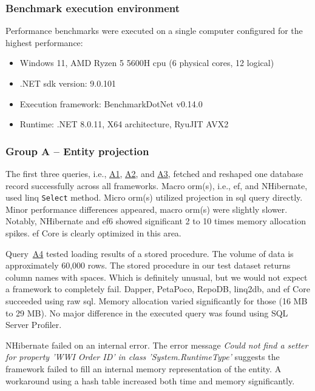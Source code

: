 \subsubsection{Benchmark execution environment}
Performance benchmarks were executed on a single computer configured for the highest performance:
\begin{itemize}
    \item Windows 11, AMD Ryzen 5 5600H \acrshort{cpu} (6 physical cores, 12 logical)
    \item .NET \acrshort{sdk} version: 9.0.101
    \item Execution framework: BenchmarkDotNet v0.14.0
    \item Runtime: .NET 8.0.11, X64 architecture, RyuJIT AVX2
\end{itemize}

\subsubsection{Group A -- Entity projection}
The first three queries, i.e., \hyperref[query:a1]{A1}, \hyperref[query:a2]{A2}, and \hyperref[query:a3]{A3}, fetched and reshaped one database record successfully across all frameworks. Macro \acrshort{orm}(s), i.e., \acrshort{ef}, and NHibernate, used \acrshort{linq} \texttt{Select} method. Micro \acrshort{orm}(s) utilized projection in \acrshort{sql} query directly.
Minor performance differences appeared, macro \acrshort{orm}(s) were slightly slower. Notably, NHibernate and \acrshort{ef}6 showed significant 2 to 10 times memory allocation spikes. \acrshort{ef} Core is clearly optimized in this area.

Query~\hyperref[query:a4]{A4} tested loading results of a stored procedure. The volume of data is approximately 60,000 rows. The stored procedure in our test dataset returns column names with spaces. Which is definitely unusual, but we would not expect a framework to completely fail. Dapper, PetaPoco, RepoDB, linq2db, and \acrshort{ef} Core succeeded using raw \acrshort{sql}. Memory allocation varied significantly for those (16 MB to 29 MB). No major difference in the executed query was found using SQL Server Profiler.

NHibernate failed on an internal error. The error message \textit{Could not find a setter for property 'WWI Order ID' in class 'System.RuntimeType'} suggests the framework failed to fill an internal memory representation of the entity. A workaround using a hash table increased both time and memory significantly.

